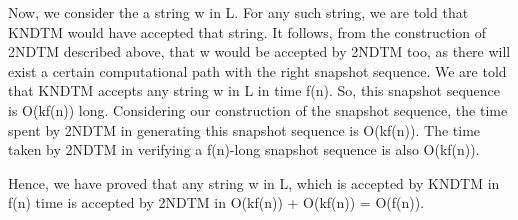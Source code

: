 \documentclass[10pt]{article}
\begin{document}
Now, we consider the a string w in L. For any such string, we are told that KNDTM would have accepted that string. It follows, from the construction of 2NDTM described above, that w would be accepted by 2NDTM too, as there will exist a certain computational path with the right snapshot sequence. We are told that KNDTM accepts any string w in L in time f(n). So, this snapshot sequence is O(kf(n)) long. Considering our construction of the snapshot sequence, the time spent by 2NDTM in generating this snapshot sequence is O(kf(n)). The time taken by 2NDTM in verifying a f(n)-long snapshot sequence is also O(kf(n)).

Hence, we have proved that any string w in L, which is accepted by KNDTM in f(n) time is accepted by 2NDTM in O(kf(n)) + O(kf(n)) = O(f(n)).
\end{document}

